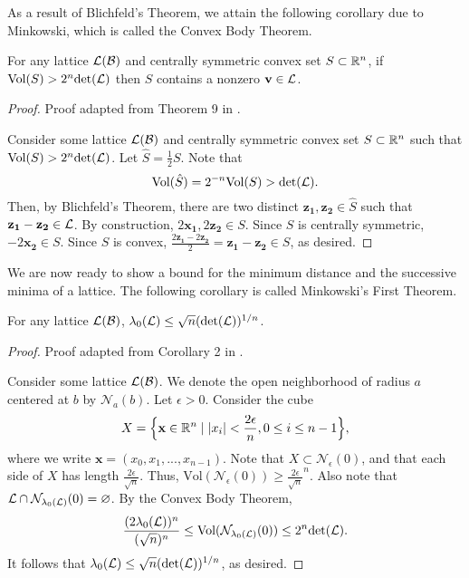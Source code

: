 \documentclass[a4paper,12pt]{article}
\begin{document}
As a result of Blichfeld's Theorem, we attain the following corollary due to Minkowski, which is called the Convex Body Theorem. 

\begin{thm}
    For any lattice $\mathcal{L}(\mathcal{B})$ and centrally symmetric convex set $S \subset \mathbb{R}^n$, if $\text{Vol}(S) > 2^{n}\text{det}(\mathcal{L})$ then $S$ contains a nonzero $\mathbf{v} \in \mathcal{L}$.
\end{thm}

\begin{proof}
    Proof adapted from Theorem 9 in \cite{RegevIntro}.
    
    Consider some lattice $\mathcal{L}(\mathcal{B})$ and centrally symmetric convex set $S \subset \mathbb{R}^n$ such that $\text{Vol}(S) > 2^{n}\text{det}(\mathcal{L})$. Let $\hat{S} = \frac{1}{2}S$. Note that $$\text{Vol}(\hat{S}) = 2^{-n}\text{Vol}(S) > \text{det}(\mathcal{L}).$$ Then, by Blichfeld's Theorem, there are two distinct $\mathbf{z_{1}},\mathbf{z_{2}} \in \hat{S}$ such that $\mathbf{z_{1}}-\mathbf{z_{2}} \in \mathcal{L}$. By construction, $2\mathbf{x_{1}},2\mathbf{z_{2}} \in S$. Since $S$ is centrally symmetric, $-2\mathbf{x_{2}} \in S$. Since $S$ is convex, $\frac{2\mathbf{z_{1}} - 2\mathbf{z_{2}}}{2} = \mathbf{z_{1}}-\mathbf{z_{2}} \in S$, as desired. 
\end{proof}

We are now ready to show a bound for the minimum distance and the successive minima of a lattice. The following corollary is called Minkowski's First Theorem. 

\begin{thm}
    For any lattice $\mathcal{L}(\mathcal{B})$, $\lambda_{0}(\mathcal{L}) \leq \sqrt{n}(\text{det}(\mathcal{L}))^{1/n}$.
\end{thm}

\begin{proof}
    Proof adapted from Corollary 2 in \cite{RegevIntro}.
    
    Consider some lattice $\mathcal{L}(\mathcal{B})$. We denote the open neighborhood of radius $a$ centered at $b$ by $\mathcal{N}_{a}(b)$.
    Let $\epsilon > 0$. Consider the cube $$X = \Big\lbrace \mathbf{x}\in\mathbb{R}^n \mid |x_{i}| < \frac{2\epsilon}{n}, 0\leq i\leq n-1 \Big\rbrace ,$$ where we write $\mathbf{x} = (x_0, x_1,...,x_{n-1})$. Note that $X \subset \mathcal{N}_{\epsilon}(0)$, and that each side of $X$ has length $\frac{2\epsilon}{\sqrt{n}}$. Thus, $\text{Vol}(\mathcal{N}_{\epsilon}(0)) \geq \frac{2\epsilon}{\sqrt{n}}^n$. Also note that $\mathcal{L} \cap \mathcal{N}_{\lambda_{0}(\mathcal{L})}(0) = \varnothing$. By the Convex Body Theorem, $$\frac{(2\lambda_{0}(\mathcal{L}))^n}{(\sqrt{n})^n} \leq \text{Vol}(\mathcal{N}_{\lambda_{0}(\mathcal{L})}(0)) \leq 2^{n}\text{det}(\mathcal{L}).$$ It follows that $\lambda_{0}(\mathcal{L}) \leq \sqrt{n}(\text{det}(\mathcal{L}))^{1/n}$, as desired.
\end{proof}
\end{document}
